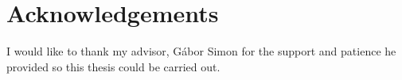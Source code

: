 \chapter*{Acknowledgements}

I would like to thank my advisor, Gábor Simon for the support and patience he provided so this thesis could be carried out.